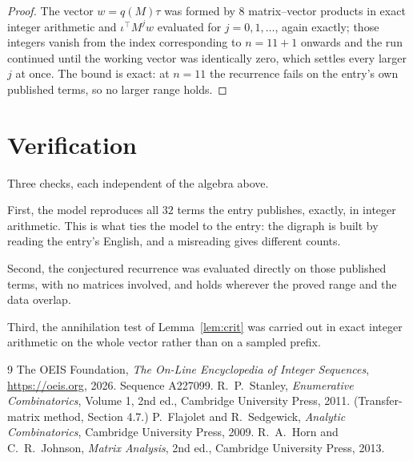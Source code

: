 \documentclass[11pt,a4paper]{article}
\theoremstyle{plain}
\theoremstyle{definition}
\begin{document}
\begin{proof}
The vector $w=q(M)\tau$ was formed by $8$ matrix--vector products in exact integer
arithmetic and $\iota^{\!\top}M^{j}w$ evaluated for $j=0,1,\dots$, again exactly; those
integers vanish from the index corresponding to $n=11+1$ onwards and the run continued
until the working vector was identically zero, which settles every larger $j$ at once. The bound is exact: at $n=11$ the recurrence fails on the entry's own published terms, so no larger range holds.
\end{proof}

\section{Verification}

Three checks, each independent of the algebra above.

First, the model reproduces all $32$ terms the entry publishes, exactly, in integer
arithmetic. This is what ties the model to the entry: the digraph is built by reading the
entry's English, and a misreading gives different counts.

Second, the conjectured recurrence was evaluated directly on those published terms, with no
matrices involved, and holds wherever the proved range and the data overlap.

Third, the annihilation test of Lemma~\ref{lem:crit} was carried out in exact integer
arithmetic on the whole vector rather than on a sampled prefix.

\begin{thebibliography}{9}
 The OEIS Foundation, \emph{The On-Line Encyclopedia of Integer
Sequences}, \url{https://oeis.org}, 2026. Sequence A227099.
 R.~P.~Stanley, \emph{Enumerative Combinatorics}, Volume 1, 2nd ed.,
Cambridge University Press, 2011. (Transfer-matrix method, Section 4.7.)
 P.~Flajolet and R.~Sedgewick, \emph{Analytic Combinatorics}, Cambridge
University Press, 2009.
 R.~A.~Horn and C.~R.~Johnson, \emph{Matrix Analysis}, 2nd ed., Cambridge
University Press, 2013.
\end{thebibliography}
\end{document}
